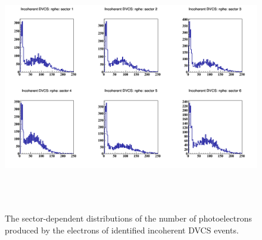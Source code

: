 \begin{figure}[tbp]
   \hspace{-1.0 cm}
   \includegraphics[height=11cm]{fig/e_nphe_incoh.png}
\caption{The sector-dependent distributions of the number of photoelectrons 
produced by the electrons of identified incoherent DVCS events.  }
\label{fig:nphe_after_excl_cuts_incoh}
\end{figure}

